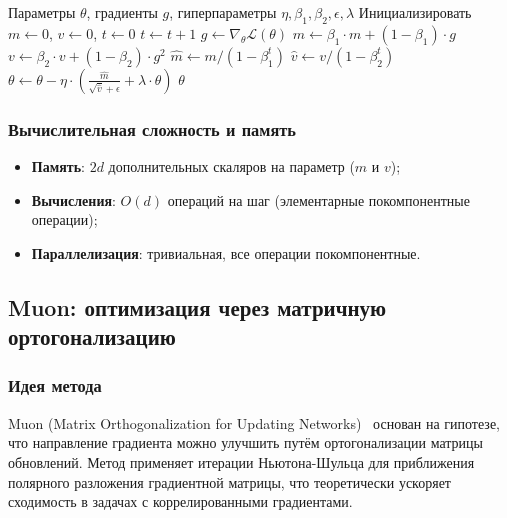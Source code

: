 \documentclass[a4paper,12pt]{article}
\begin{document}
\begin{algorithm}[H]
\caption{AdamW}
\label{alg:adamw}
\begin{algorithmic}[1]
\Require Параметры $\theta$, градиенты $g$, гиперпараметры $\eta, \beta_1, \beta_2, \epsilon, \lambda$
\State Инициализировать $m \gets 0$, $v \gets 0$, $t \gets 0$
    \State $t \gets t + 1$
    \State $g \gets \nabla_\theta \mathcal{L}(\theta)$ 
    \State $m \gets \beta_1 \cdot m + (1 - \beta_1) \cdot g$
    \State $v \gets \beta_2 \cdot v + (1 - \beta_2) \cdot g^2$
    \State $\hat{m} \gets m / (1 - \beta_1^t)$
    \State $\hat{v} \gets v / (1 - \beta_2^t)$
    \State $\theta \gets \theta - \eta \cdot \left( \frac{\hat{m}}{\sqrt{\hat{v}} + \epsilon} + \lambda \cdot \theta \right)$
\EndWhile
\State \Return $\theta$
\end{algorithmic}
\end{algorithm}

\subsubsection{Вычислительная сложность и память}

\begin{itemize}
    \item \textbf{Память}: $2d$ дополнительных скаляров на параметр ($m$ и $v$);
    \item \textbf{Вычисления}: $O(d)$ операций на шаг (элементарные покомпонентные операции);
    \item \textbf{Параллелизация}: тривиальная, все операции покомпонентные.
\end{itemize}

\subsection{Muon: оптимизация через матричную ортогонализацию}

\subsubsection{Идея метода}

Muon (Matrix Orthogonalization for Updating Networks)~\cite{moonshot2024muon} основан на гипотезе, что направление градиента можно улучшить путём ортогонализации матрицы обновлений. Метод применяет итерации Ньютона-Шульца для приближения полярного разложения градиентной матрицы, что теоретически ускоряет сходимость в задачах с коррелированными градиентами.
\end{document}
